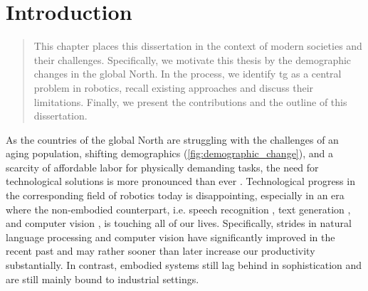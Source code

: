 \chapter{Introduction} %
\label{cha:intro}


\begin{abstract}
This chapter places this dissertation in the context of
modern societies and their challenges. Specifically, we
motivate this thesis by the demographic changes in the
global North. In the process, we identify
\acl{tg} as a central problem in robotics, recall existing
approaches and discuss their limitations. Finally, we
present the contributions and the outline of this
dissertation.
\end{abstract}

\newpage


As the countries of the global North are struggling with the
challenges of an aging population, shifting demographics
(\cref{fig:demographic_change}), and a scarcity of
affordable labor for physically demanding tasks, the need
for technological solutions is more pronounced than ever
\cite{ince2015economic,mcgrath2021report,astrov2021economies}.
Technological progress in the
corresponding field of robotics today is disappointing,
especially in an era where the non-embodied counterpart,
i.e. speech recognition \cite{radford2023robust},
text generation \cite{hoffmann2022training},
and computer vision \cite{voulodimos2018deep}, is
touching all of our lives. Specifically, strides in natural
language processing and computer vision have significantly
improved in the recent past and may rather sooner than later
increase our productivity substantially. In contrast, 
embodied systems still lag behind in
sophistication and are still mainly bound to industrial
settings.

